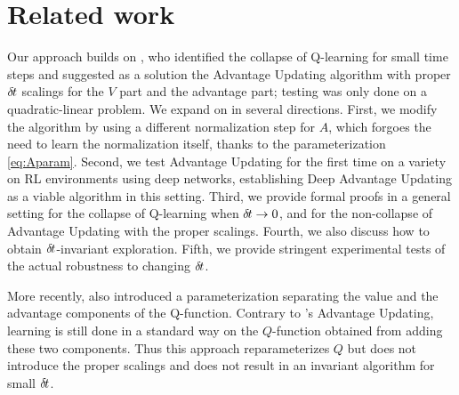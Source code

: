 \section{Related work}
\label{sec:related}

Our approach builds on \cite{adv_upd}, who identified the collapse of
Q-learning for small time steps and suggested as a solution the Advantage
Updating algorithm with proper ${\delta\hspace{-.1em}t}$ scalings for the $V$ part and
the advantage part; testing was only done on a quadratic-linear problem.
We expand on \cite{adv_upd} in several directions. First, we modify the
algorithm by
using a different normalization step for $A$, which forgoes the need to
learn the normalization itself, thanks to the parameterization
\eqref{eq:Aparam}. Second, we test Advantage Updating for the first time on a
variety on RL environments using deep networks, establishing Deep
Advantage Updating as a viable algorithm in this setting.  Third,
we provide formal proofs in a general setting for the collapse of Q-learning when ${\delta\hspace{-.1em}t}\to
0$, and for the non-collapse of Advantage Updating with the proper scalings.
Fourth, we also discuss how to obtain ${\delta\hspace{-.1em}t}$-invariant exploration. Fifth, we
provide stringent experimental tests of the actual robustness to changing
${\delta\hspace{-.1em}t}$.


More recently, \cite{dueling_nets} also introduced a parameterization separating
the value and the advantage components of the Q-function. Contrary to
\cite{advup}'s Advantage Updating, learning is still done in a standard
way on the $Q$-function obtained from adding these two components. Thus this
approach reparameterizes $Q$ but does not introduce the proper scalings
and does not result in an invariant algorithm for small ${\delta\hspace{-.1em}t}$.%

